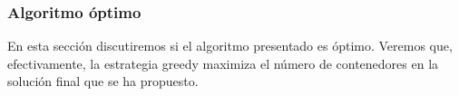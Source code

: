 \subsubsection{Algoritmo óptimo}

En esta sección discutiremos si el algoritmo presentado es óptimo. Veremos que,
efectivamente, la estrategia greedy maximiza el número de contenedores 
en la solución final que se ha propuesto. 